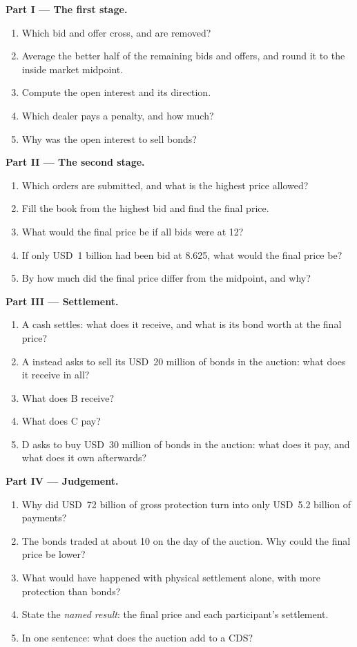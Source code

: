 \begin{problem}
\medskip\noindent\textbf{Part I --- The first stage.}
\begin{enumerate}
\item Which bid and offer cross, and are removed?
\item Average the better half of the remaining bids and offers, and round it to the
inside market midpoint.
\item Compute the open interest and its direction.
\item Which dealer pays a penalty, and how much?
\item Why was the open interest to sell bonds?
\end{enumerate}

\medskip\noindent\textbf{Part II --- The second stage.}
\begin{enumerate}[resume]
\item Which orders are submitted, and what is the highest price allowed?
\item Fill the book from the highest bid and find the final price.
\item What would the final price be if all bids were at 12?
\item If only USD~1 billion had been bid at 8.625, what would the final price be?
\item By how much did the final price differ from the midpoint, and why?
\end{enumerate}

\medskip\noindent\textbf{Part III --- Settlement.}
\begin{enumerate}[resume]
\item A cash settles: what does it receive, and what is its bond worth at the final
price?
\item A instead asks to sell its USD~20 million of bonds in the auction: what does it
receive in all?
\item What does B receive?
\item What does C pay?
\item D asks to buy USD~30 million of bonds in the auction: what does it pay, and what
does it own afterwards?
\end{enumerate}

\medskip\noindent\textbf{Part IV --- Judgement.}
\begin{enumerate}[resume]
\item Why did USD~72 billion of gross protection turn into only USD~5.2 billion of
payments?
\item The bonds traded at about 10 on the day of the auction. Why could the final
price be lower?
\item What would have happened with physical settlement alone, with more protection
than bonds?
\item State the \emph{named result}: the final price and each participant's
settlement.
\item In one sentence: what does the auction add to a CDS?
\end{enumerate}
\end{problem}


